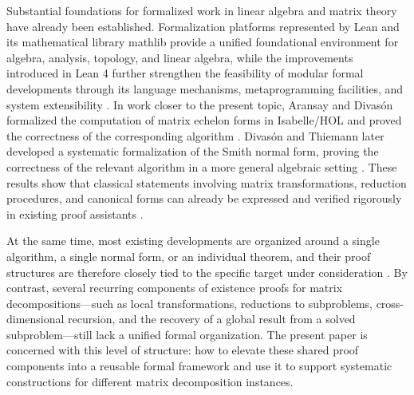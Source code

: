 \documentclass[pdflatex,sn-mathphys-num]{sn-jnl}%
\theoremstyle{thmstyleone}%
\theoremstyle{thmstyletwo}%
\theoremstyle{thmstylethree}%
\begin{document}
Substantial foundations for formalized work in linear algebra and matrix theory have already been established. Formalization platforms represented by Lean and its mathematical library mathlib provide a unified foundational environment for algebra, analysis, topology, and linear algebra, while the improvements introduced in Lean 4 further strengthen the feasibility of modular formal developments through its language mechanisms, metaprogramming facilities, and system extensibility \cite{mathlib2020,moura2021lean}. In work closer to the present topic, Aransay and Divasón formalized the computation of matrix echelon forms in Isabelle/HOL and proved the correctness of the corresponding algorithm \cite{aransay2016formalisation}. Divasón and Thiemann later developed a systematic formalization of the Smith normal form, proving the correctness of the relevant algorithm in a more general algebraic setting \cite{divason2022formalization}. These results show that classical statements involving matrix transformations, reduction procedures, and canonical forms can already be expressed and verified rigorously in existing proof assistants \cite{aransay2016formalisation,divason2022formalization}.

At the same time, most existing developments are organized around a single algorithm, a single normal form, or an individual theorem, and their proof structures are therefore closely tied to the specific target under consideration \cite{aransay2016formalisation,divason2022formalization}. By contrast, several recurring components of existence proofs for matrix decompositions—such as local transformations, reductions to subproblems, cross-dimensional recursion, and the recovery of a global result from a solved subproblem—still lack a unified formal organization. The present paper is concerned with this level of structure: how to elevate these shared proof components into a reusable formal framework and use it to support systematic constructions for different matrix decomposition instances.

\end{document}
